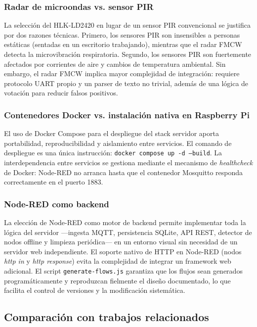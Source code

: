 \subsubsection{Radar de microondas vs. sensor PIR}

La selección del HLK-LD2420 en lugar de un sensor PIR convencional se justifica
por dos razones técnicas. Primero, los sensores PIR son insensibles a personas
estáticas (sentadas en un escritorio trabajando), mientras que el radar FMCW
detecta la microvibración respiratoria. Segundo, los sensores PIR son fuertemente
afectados por corrientes de aire y cambios de temperatura ambiental. Sin embargo,
el radar FMCW implica mayor complejidad de integración: requiere protocolo UART
propio y un parser de texto no trivial, además de una lógica de votación para
reducir falsos positivos.

\subsubsection{Contenedores Docker vs. instalación nativa en Raspberry Pi}

El uso de Docker Compose para el despliegue del stack servidor aporta portabilidad,
reproducibilidad y aislamiento entre servicios. El comando de despliegue es una
única instrucción: \texttt{docker compose up -d --build}. La interdependencia entre
servicios se gestiona mediante el mecanismo de \textit{healthcheck} de Docker:
Node-RED no arranca hasta que el contenedor Mosquitto responda correctamente en el
puerto 1883.

\subsubsection{Node-RED como backend}

La elección de Node-RED como motor de backend permite implementar toda la lógica del
servidor —ingesta MQTT, persistencia SQLite, API REST, detector de nodos offline y
limpieza periódica— en un entorno visual sin necesidad de un servidor web
independiente. El soporte nativo de HTTP en Node-RED (nodos \textit{http in} y
\textit{http response}) evita la complejidad de integrar un framework web
adicional. El script \texttt{generate-flows.js} garantiza que los flujos sean
generados programáticamente y reproduzcan fielmente el diseño documentado, lo que
facilita el control de versiones y la modificación sistemática.

\subsection{Comparación con trabajos relacionados}

